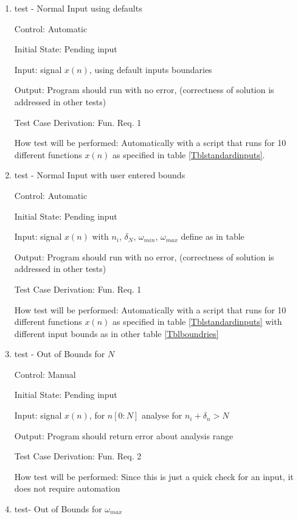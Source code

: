 \documentclass[12pt, titlepage]{article}
\begin{document}
\begin{enumerate}

\item{test - Normal Input using defaults\\}

Control: Automatic
					
Initial State: Pending input
					
Input: signal $x(n)$, using default inputs boundaries 
					
Output: Program should run with no error, (correctness of solution is addressed in other tests)

Test Case Derivation: Fun. Req. 1
					
How test will be performed: Automatically with a script that runs for 10 different functions $x(n)$ as specified in table \ref{Tblstandardinputs}.

\item{test - Normal Input with user entered bounds\\}

Control: Automatic
					
Initial State: Pending input
					
Input: signal $x(n)$ with $n_i$, $\delta_N$, $\omega_{min} $, $\omega_{max}$ define as in table 
					
Output: Program should run with no error, (correctness of solution is addressed in other tests)

Test Case Derivation: Fun. Req. 1
					
How test will be performed: Automatically with a script that runs for 10 different functions $x(n)$ as specified in table \ref{Tblstandardinputs} with different input bounds as in other table \ref{Tblboundries}

\item{test - Out of Bounds for $N$\\}

Control: Manual
					
Initial State: Pending input
					
Input: signal $x(n)$, for $n[0:N]$ analyse for $n_i + \delta_n > N$
					
Output: Program should return error about analysis range

Test Case Derivation: Fun. Req. 2
					
How test will be performed: Since this is just a quick check for an input, it does not require automation 
					
\item{test- Out of Bounds for $\omega_{max}$\\}


\end{enumerate}
\end{document}
